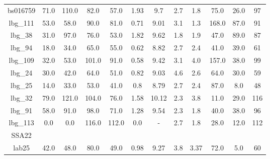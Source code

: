 \documentclass[fleqn,usenatbib]{mn2e}
\begin{document}
\begin{table*}
\begin{tabular}{cccccccccccc}
bs016759        & 71.0                    & 110.0                    & 82.0                  & 57.0                   & 1.93           & 9.7       & 2.7      & 1.8       & 75.0    & 26.0      & 97  \\
lbg\_111        & 53.0                    & 58.0                     & 90.0                  & 81.0                   & 0.71           & 9.01      & 3.1      & 1.3        & 168.0   & 87.0      & 91 \\
lbg\_38         & 31.0                    & 97.0                     & 76.0                  & 53.0                   & 1.82           & 9.62      & 1.8      & 1.9       & 47.0    & 89.0      & 87 \\
lbg\_94         & 18.0                    & 34.0                     & 65.0                  & 55.0                   & 0.62           & 8.82      & 2.7      & 2.4       & 41.0    & 39.0      & 61 \\
lbg\_109        & 32.0                    & 53.0                     & 101.0                 & 91.0                   & 0.58           & 9.42      & 3.1      & 4.0        & 157.0   & 38.0      & 99 \\
lbg\_24         & 30.0                    & 42.0                     & 64.0                  & 51.0                   & 0.82           & 9.03      & 4.6       & 2.6       & 64.0    & 30.0      & 59 \\
lbg\_25         & 14.0                    & 33.0                     & 53.0                  & 41.0                   & 0.8            & 8.79      & 2.7      & 2.4        & 87.0    & 8.0       & 48 \\
lbg\_32         & 79.0                    & 121.0                    & 104.0                 & 76.0                   & 1.58           & 10.12     & 2.3      & 3.8       & 11.0    & 29.0      & 116 \\
lbg\_91         & 58.0                    & 91.0                     & 98.0                  & 71.0                   & 1.28           & 9.54      & 2.3      & 1.8        & 40.0    & 38.0      & 96 \\
lbg\_113        & 0.0                    & 0.0                      & 116.0                 & 112.0                  & 0.0            & - & 2.7      & 1.8       & 28.0    & 12.0      & 112 \\
 \hline
 \hline
 SSA22 & & & & & & & & & & & \\
 \hline
 \hline
lab25         & 42.0                    & 48.0                     & 80.0                  & 49.0                   & 0.98           & 9.27      & 3.8      & 3.37       & 72.0    & 5.0       & 60 \\

\end{tabular}
\end{table*}
\end{document}
